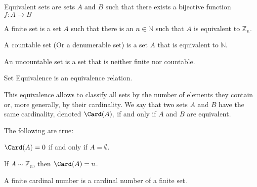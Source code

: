 \documentclass[crop=false,class=book,oneside]{standalone}
\begin{document}
            \begin{definition}
                Equivalent sets are sets $A$ and $B$ such that
                there exists a bijective function
                $f:{A}\rightarrow{B}$
            \end{definition}
            \begin{definition}
                A finite set is a set $A$ such that there
                is an ${n}\in{\mathbb{N}}$ such that $A$
                is equivalent to $\mathbb{Z}_{n}$.
            \end{definition}
            \begin{definition}
                A countable set (Or a denumerable set) is a
                set $A$ that is equivalent to $\mathbb{N}$.
            \end{definition}
            \begin{definition}
                An uncountable set is a set that is neither finite
                nor countable.
            \end{definition}
            \begin{theorem*}
                Set Equivalence is an equivalence relation.
            \end{theorem*}
            This equivalence allows to classify all sets by the
            number of elements they contain or, more generally,
            by their cardinality. We say that two sets $A$ and
            $B$ have the same cardinality, denoted
            $\Card(A)$, if and only if $A$ and $B$ are equivalent.
            \begin{theorem*}
                The following are true:
                \begin{enumerate}
                    \begin{multicols}{2}
                        \item $\Card(A)=0$ if and only if
                              $A=\emptyset$.
                        \item If ${A}\sim{\mathbb{Z}_{n}}$, then
                              $\Card(A)=n$.
                    \end{multicols}
                \end{enumerate}
            \end{theorem*}
            \begin{definition}
                A finite cardinal number is a cardinal
                number of a finite set.
            \end{definition}
\end{document}
